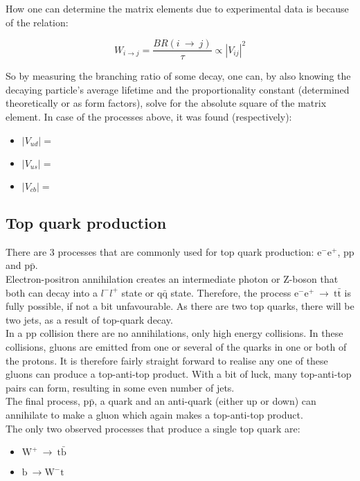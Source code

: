 \documentclass[11pt,a4paper]{article}
\begin{document}
How one can determine the matrix elements due to experimental data is because of the relation:

\begin{equation}
W_{i\rightarrow j} = \frac{BR(i \:\rightarrow\: j)}{\tau} \propto |V_{ij}|^2
\end{equation}

So by measuring the branching ratio of some decay, one can, by also knowing the decaying particle's average lifetime and the proportionality constant (determined theoretically or as form factors), solve for the absolute square of the matrix element. In case of the processes above, it was found (respectively):

\begin{itemize}\centering
	\item $|V_{ud}| = $
	\item $|V_{us}| = $
	\item $|V_{cb}| = $
\end{itemize}

\subsection{Top quark production}
There are 3 processes that are commonly used for top quark production: $\text{e}^-\text{e}^+$, $\text{p}\text{p}$ and $\text{p}\bar{\text{p}}$.\\
Electron-positron annihilation creates an intermediate photon or Z-boson that both can decay into a $l^-l^+$ state or $\text{q}\bar{\text{q}}$ state. Therefore, the process $\text{e}^-\text{e}^+ \:\rightarrow\: \text{t}\bar{\text{t}}$ is fully possible, if not a bit unfavourable. As there are two top quarks, there will be two jets, as a result of top-quark decay.\\
In a pp collision there are no annihilations, only high energy collisions. In these collisions, gluons are emitted from one or several of the quarks in one or both of the protons. It is therefore fairly straight forward to realise any one of these gluons can produce a top-anti-top product. With a bit of luck, many top-anti-top pairs can form, resulting in some even number of jets.\\
The final process, $\text{p}\bar{\text{p}}$, a quark and an anti-quark (either up or down) can annihilate to make a gluon which again makes a top-anti-top product.\\
The only two observed processes that produce a single top quark are:

\begin{itemize}
	\item $\text{W}^+\:\rightarrow\:\text{t}\bar{\text{b}}$
	\item $\text{b}\:\rightarrow\text{W}^-\text{t}$
\end{itemize}
\end{document}

